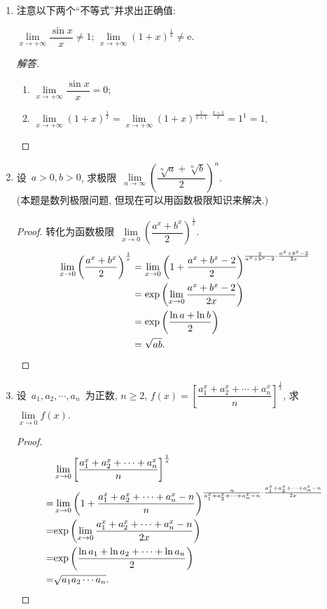 \documentclass[UTF8,a4paper,11pt,twoside]{book}
\newcommand{\e}{\mathrm e}
\begin{document}
\begin{enumerate}
	\item 注意以下两个``不等式''并求出正确值:
	      \begin{tabenum}[(1)]
		      \tabenumitem $\lim\limits_{x\to+\infty} \dfrac{\sin{x}}{x}\neq 1$;
		      \tabenumitem $\lim\limits_{x\to+\infty} (1+x)^{\frac{1}{x}}\neq \e$.
	      \end{tabenum}
	      \begin{proof}[解答]
		      \begin{enumerate}[(1)]
			      \item $\lim\limits_{x\to+\infty} \dfrac{\sin{x}}{x}=0$;
			      \item $\lim\limits_{x\to+\infty} (1+x)^{\frac{1}{x}}=\lim\limits_{x\to+\infty} (1+x)^{\frac{1}{x+1}\cdot\frac{x+1}{x}}=1^1=1$. \qedhere
		      \end{enumerate}
	      \end{proof}

	\item 设~$a>0, b>0$, 求极限~$\lim\limits_{n\to\infty} \left(\dfrac{\sqrt[n]{a}+\sqrt[n]{b}}{2}\right)^n$. \\
	      (本题是数列极限问题, 但现在可以用函数极限知识来解决.)
	      \begin{proof}
			转化为函数极限~$\lim\limits_{x\to 0} \left(\dfrac{a^x+b^x}{2}\right)^{\frac{1}{x}}$.
			\[
				\begin{split}
					\lim\limits_{x\to 0} \left(\dfrac{a^x+b^x}{2}\right)^{\frac{1}{x}}&=\lim\limits_{x\to 0} \left(1+\dfrac{a^x+b^x-2}{2}\right)^{\frac{2}{a^x+b^x-2}\cdot\frac{a^x+b^x-2}{2x}}\\
					&={\rm exp}\left(\lim\limits_{x\to 0}\dfrac{a^x+b^x-2}{2x}\right)\\
					&={\rm exp}\left(\dfrac{\ln{a}+\ln{b}}{2}\right)\\
					&=\sqrt{ab}. \qedhere
				\end{split}
			\]
	      \end{proof}
	\item 设~$a_1, a_2, \cdots, a_n$~为正数, $n\geqslant 2$, $f(x)=\left[\dfrac{a_1^x+a_2^x+\cdots+a_n^x}{n}\right]^{\frac{1}{x}}$, 求~$\lim\limits_{x\to 0} f(x)$.
		\begin{proof}
			\[
				\begin{split}
					& \lim\limits_{x\to 0} \left[\dfrac{a_1^x+a_2^x+\cdots+a_n^x}{n}\right]^{\frac{1}{x}}\\
					=& \lim\limits_{x\to 0} \left(1+\dfrac{a_1^x+a_2^x+\cdots+a_n^x-n}{n}\right)^{\frac{n}{a_1^x+a_2^x+\cdots+a_n^x-n}\cdot\frac{a_1^x+a_2^x+\cdots+a_n^x-n}{2x}}\\
					=& {\rm exp}\left(\lim\limits_{x\to 0} \dfrac{a_1^x+a_2^x+\cdots+a_n^x-n}{2x}\right)\\
					=& {\rm exp}\left(\dfrac{\ln{a_1}+\ln{a_2}+\cdots+\ln{a_n}}{2}\right)\\
					=& \sqrt{a_1a_2\cdots a_n}.
				\end{split}
			\]
		\end{proof}
		

\end{enumerate}
\end{document}
